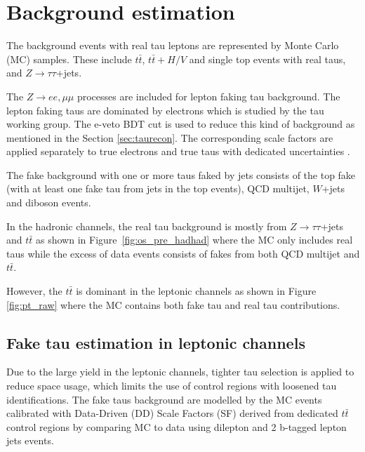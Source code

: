 \section{Background estimation}
\label{sec:background}

%

The background events with real tau leptons are represented by Monte Carlo (MC) samples. These include $t\bar{t}$, $t\bar{t}+H/V$ and 
single top events with real taus, and $Z\to\tau\tau$+jets.

The $Z\to ee,\mu\mu$ processes are included for lepton faking tau background. The lepton faking taus are dominated by electrons which is studied by the tau working group. The e-veto BDT cut is used to reduce this kind of background as mentioned in the Section \ref{sec:taurecon}. The corresponding scale factors are applied separately to true electrons and true taus with dedicated uncertainties \cite{TauCP}. 

%

The fake background with one or more taus faked by jets consists of the top fake (with at least one fake tau from jets in the top events), QCD multijet, $W$+jets and diboson events.

In the hadronic channels, the real tau background is mostly from $Z\to\tau\tau$+jets and $t\bar t$  as shown in Figure~\ref{fig:os_pre_hadhad} where the MC only includes real taus while the excess of data events consists of fakes from both QCD multijet and $t\bar t$.

However, the $t\bar t$ is dominant in the leptonic channels as shown in Figure \ref{fig:pt_raw} where the MC contains both fake tau and real tau contributions.





\subsection{Fake tau estimation in leptonic channels}
\label{sec:sf_method}

Due to the large yield in the leptonic channels, tighter tau selection is applied to reduce space usage, which limits the use of control regions with loosened tau identifications. The fake taus background are modelled by the MC events calibrated with Data-Driven (DD) Scale Factors (SF) derived from dedicated $t\bar t$ control regions by comparing MC to data using dilepton and 2 b-tagged lepton jets events.

